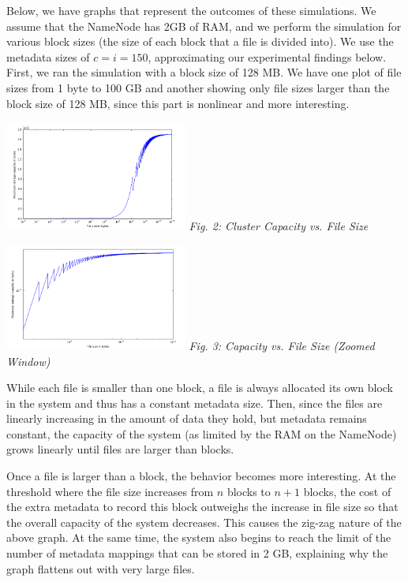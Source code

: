 \documentclass[11pt, a4paper]{article}
\begin{document}
\begin{multicols*}{2}
Below, we have graphs that represent the outcomes of these simulations. We assume that the NameNode has 2GB of RAM, and we perform the simulation for various block sizes (the size of each block that a file is divided into). We use the metadata sizes of $c = i = 150$, approximating our experimental findings below. First, we ran the simulation with a block size of 128 MB. We have one plot of file sizes from 1 byte to 100 GB and another showing only file sizes larger than the block size of 128 MB, since this part is nonlinear and more interesting. 
\begin{center}
	\includegraphics[keepaspectratio=true, width=0.45\textwidth]{logScale}
	\textit{Fig. 2: Cluster Capacity vs. File Size}
\end{center}

\begin{center}
	\includegraphics[keepaspectratio=true, width=0.45\textwidth]{logLogScale}
	\textit{Fig. 3: Capacity vs. File Size (Zoomed Window)}	
\end{center}

While each file is smaller than one block, a file is always allocated its own block in the system and thus has a constant metadata size. Then, since the files are linearly increasing in the amount of data they hold, but metadata remains constant, the capacity of the system (as limited by the RAM on the NameNode) grows linearly until files are larger than blocks. 

Once a file is larger than a block, the behavior becomes more interesting. At the threshold where the file size increases from $n$ blocks to $n+1$ blocks, the cost of the extra metadata to record this block outweighs the increase in file size so that the overall capacity of the system decreases. This causes the zig-zag nature of the above graph. At the same time, the system also begins to reach the limit of the number of metadata mappings that can be stored in 2 GB, explaining why the graph flattens out with very large files. 


\end{multicols*}
\end{document}
